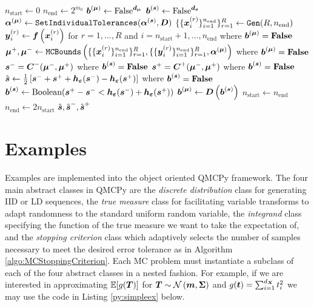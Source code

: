 \documentclass{article}[12pt]
\begin{document}
\begin{algorithm}[h!]
\begin{algorithmic}
    \State $n_\text{start} \gets 0$
    \State $n_\text{end} \gets 2^{m_0}$
    \State $\boldsymbol{b}^{(\boldsymbol{\mu})} \gets \text{False}^{\boldsymbol{d}_{\boldsymbol{\mu}}}$
    \State $\boldsymbol{b}^{(\boldsymbol{s})} \gets \text{False}^{\boldsymbol{d}_{\boldsymbol{s}}}$
    \State $\boldsymbol{\alpha}^{(\boldsymbol{\mu})} \gets \texttt{SetIndividualTolerances}(\boldsymbol{\alpha}^{(\boldsymbol{s})},\boldsymbol{D})$ 
        \State $\{\{\boldsymbol{x}_i^{(r)}\}_{i=1}^{n_\text{end}}\}_{r=1}^R \gets \texttt{Gen}(R,n_\text{end})$ \\ 
        \State $\boldsymbol{y}_i^{(r)} \gets \boldsymbol{f}\left(\boldsymbol{x}_i^{(r)}\right)$ for $r=1,\dots,R$ and $i=n_\text{start}+1,\dots,n_\text{end}$ where $\boldsymbol{b}^{(\boldsymbol{\mu})}=\textbf{\text{False}}$ \\ 
        \State $\boldsymbol{\mu}^+,\boldsymbol{\mu}^- \gets \texttt{MCBounds}\left(\{\{\boldsymbol{x}_i^{(r)}\}_{i=1}^{n_\text{end}}\}_{r=1}^R, \{\{\boldsymbol{y}_i^{(r)}\}_{i=1}^{n_\text{end}}\}_{r=1}^R,\boldsymbol{\alpha}^{(\boldsymbol{\mu})}\right)$ where $\boldsymbol{b}^{(\boldsymbol{\mu})}=\textbf{\text{False}}$ \\ 
        \State $\boldsymbol{s}^- = \boldsymbol{C}^-(\boldsymbol{\mu}^-,\boldsymbol{\mu}^+)$ where $\boldsymbol{b}^{(\boldsymbol{s})} = \textbf{\text{False}}$
        \State $\boldsymbol{s}^+ = \boldsymbol{C}^+(\boldsymbol{\mu}^-,\boldsymbol{\mu}^+)$ where $\boldsymbol{b}^{(\boldsymbol{s})} = \textbf{\text{False}}$
        \State $\hat{\boldsymbol{s}} \gets \frac{1}{2}\left[\boldsymbol{s}^-+\boldsymbol{s}^++\boldsymbol{h}_{\boldsymbol{\varepsilon}}(\boldsymbol{s}^-)-\boldsymbol{h}_{\boldsymbol{\varepsilon}}(\boldsymbol{s}^+)\right]$ where $\boldsymbol{b}^{(\boldsymbol{s})} = \textbf{\text{False}}$
        \State $\boldsymbol{b}^{(\boldsymbol{s})} \gets \text{Boolean}(\boldsymbol{s}^+-\boldsymbol{s}^- < \boldsymbol{h}_{\boldsymbol{\varepsilon}}(\boldsymbol{s}^-)+\boldsymbol{h}_{\boldsymbol{\varepsilon}}(\boldsymbol{s}^+))$
        \State $\boldsymbol{b}^{(\boldsymbol{\mu})} \gets \boldsymbol{D}\left(\boldsymbol{b}^{(\boldsymbol{s})}\right)$
        \State $n_\text{start} \gets n_\text{end}$
        \State $n_\text{end} \gets 2n_\text{start}$
    \EndWhile
    \State \Return $\hat{\boldsymbol{s}},\hat{\boldsymbol{s}}^-,\hat{\boldsymbol{s}}^+$
    \end{algorithmic}
\end{algorithm}

\section{Examples}

Examples are implemented into the object oriented QMCPy framework. The four main abstract classes in QMCPy are the \emph{discrete distribution} class for generating IID or LD sequences, the \emph{true measure} class for facilitating variable transforms to adapt randomness to the standard uniform random variable, the \emph{integrand} class specifying the function of the true measure we want to take the expectation of, and the \emph{stopping criterion} class which adaptively selects the number of samples necessary to meet the desired error tolerance as in Algorithm \ref{algo:MCStoppingCriterion}. Each MC problem must instantiate a subclass of each of the four abstract classes in a nested fashion. For example, if we are interested in approximating $\mathbb{E}[g(\boldsymbol{T})]$ for $\boldsymbol{T} \sim \mathcal{N}\left(\boldsymbol{m},\boldsymbol{\Sigma}\right)$ and $g(\boldsymbol{t})=\sum_{i=1}^{d_{\boldsymbol{X}}} t_i^2$ we may use the code in Listing \ref{py:simpleex} below.
\end{document}
